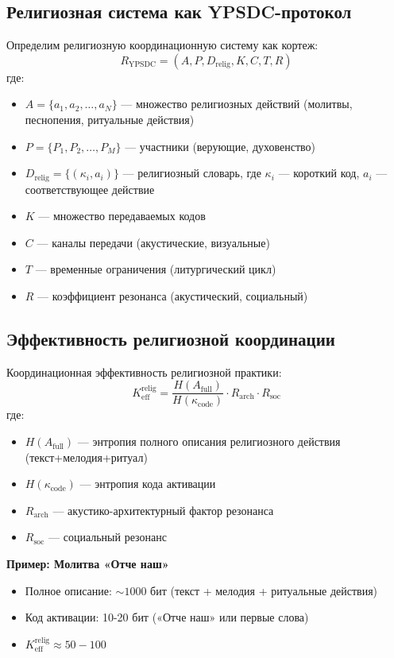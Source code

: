 \documentclass[12pt,a4paper]{article}
\begin{document}
	\subsection{Религиозная система как YPSDC-протокол}
	
	Определим религиозную координационную систему как кортеж:
	\[
	R_{\mathrm{YPSDC}} = (A, P, D_{\mathrm{relig}}, K, C, T, R)
	\]
	где:
	\begin{itemize}
		\item $A = \{a_1, a_2, \ldots, a_N\}$ — множество религиозных действий (молитвы, песнопения, ритуальные действия)
		\item $P = \{P_1, P_2, \ldots, P_M\}$ — участники (верующие, духовенство)
		\item $D_{\mathrm{relig}} = \{(\kappa_i, a_i)\}$ — религиозный словарь, где $\kappa_i$ — короткий код, $a_i$ — соответствующее действие
		\item $K$ — множество передаваемых кодов
		\item $C$ — каналы передачи (акустические, визуальные)
		\item $T$ — временные ограничения (литургический цикл)
		\item $R$ — коэффициент резонанса (акустический, социальный)
	\end{itemize}
	
	\subsection{Эффективность религиозной координации}
	
	Координационная эффективность религиозной практики:
	\[
	K_{\mathrm{eff}}^{\mathrm{relig}} = \frac{H(A_{\mathrm{full}})}{H(\kappa_{\mathrm{code}})} \cdot R_{\mathrm{arch}} \cdot R_{\mathrm{soc}}
	\]
	где:
	\begin{itemize}
		\item $H(A_{\mathrm{full}})$ — энтропия полного описания религиозного действия (текст+мелодия+ритуал)
		\item $H(\kappa_{\mathrm{code}})$ — энтропия кода активации
		\item $R_{\mathrm{arch}}$ — акустико-архитектурный фактор резонанса
		\item $R_{\mathrm{soc}}$ — социальный резонанс
	\end{itemize}
	
	\textbf{Пример: Молитва «Отче наш»}
	\begin{itemize}
		\item Полное описание: $\sim 1000$ бит (текст + мелодия + ритуальные действия)
		\item Код активации: 10-20 бит («Отче наш» или первые слова)
		\item $K_{\mathrm{eff}}^{\mathrm{relig}} \approx 50-100$
	\end{itemize}
	
\end{document}
